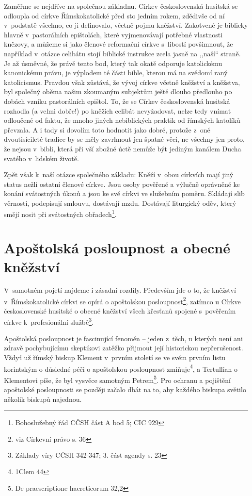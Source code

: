 Zaměřme se nejdříve na společnou základnu. Církev československá husitská se
odloupla od církve Římskokatolické před sto jedním rokem, zdědivše od ní
v~podstatě všechno, co ji definovalo, včetně pojmu kněžství. Zakotvené je
biblicky hlavně v~pastorálních epištolách, které vyjmenovávají potřebné
vlastnosti knězovy, a můžeme si jako členové reformační církve s~libostí
povšimnout, že například v~otázce celibátu stojí biblické instrukce zcela jasně
na ,,naší`` straně. Je až úsměvné, že právě tento bod, který tak okatě odporuje
katolickému kanonickému právu, je výplodem té části bible, kterou má na svědomí
raný katolicismus. Pravdou však zůstává, že vývoj církve včetně kněžství a
kněžstva, byl společný oběma našim zkoumaným subjektům ještě dlouho předlouho po
dobách vzniku pastorálních epištol. To, že se Církev československá husitská
rozhodla (a velmi dobře!) po kněžích celibát nevyžadovat, nelze tedy vnímat
odloučené od faktu, že mnoho jiných nebiblických praktik od římských katolíků
převzala. A i tady si dovolím toto hodnotit jako dobré, protože z~oné
dvoutisícileté tradice by se měly zavrhnout jen špatné věci, ne všechny jen
proto, že nejsou v~bibli, která při vší zbožné úctě nemůže být jediným kanálem
Ducha svatého v~lidském životě.

Zpět však k~naší otázce společného základu: Kněží v~obou
církvích mají jiný status nežli ostatní členové církve. Jsou osoby pověřené a
výlučně oprávněné ke konání svátostných úkonů a jsou ke své církvi ve služebním
poměru. Skládají slib věrnosti, podepisují smlouvu, dostávají mzdu. Dostávají
liturgický oděv, který smějí nosit při svátostných
obřadech\footnote{Bohoslužebný řád CČSH část A bod 5; CIC 929}.

\section{Apoštolská posloupnost a obecné kněžství}
V~samotném pojetí najdeme i zásadní rozdíly. Především jde o to, že kněžství
v~Římskokatolické církvi se opírá o apoštolskou posloupnost\footnote{viz
Církevní právo s. 36}, zatímco u Církve
československé husitské o obecné kněžství všech křesťanů spojené s~pověřením
církve k~profesionální službě\footnote{Základy víry CČSH 342-347; 3. část agendy
s. 23}.

Apoštolská posloupnost je fascinující fenomén --
jeden z~těch, u kterých není ani zdravě pochybujícímu skeptikovi zatěžko
přijmout její historickou nepřerušenost. Vždyť už římský biskup Klement v~prvním
století se ve svém prvním listu korintským o důsledné péči o apoštolskou
posloupnost zmiňuje\footnote{1Clem 44}, a Tertullian o Klementovi píše, že byl
vysvěce samotným Petrem\footnote{De praescriptione haereticorum 32,2}. Pro
ochranu a pojištění apoštolské posloupnosti se později začalo dbát na to, aby
každého biskupa světilo několik biskupů najednou.

